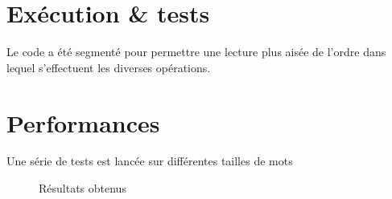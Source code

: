 \section{Exécution \& tests} %
\label{sec:execution}

Le code a été segmenté pour permettre une lecture plus aisée de l'ordre dans lequel s'effectuent les diverses opérations.

\section{Performances} %
\label{sec:perf}

Une série de tests est lancée sur différentes tailles de mots

\begin{figure}[H]
\centering
\caption{Résultats obtenus}
\label{fig:stats}
\end{figure}


